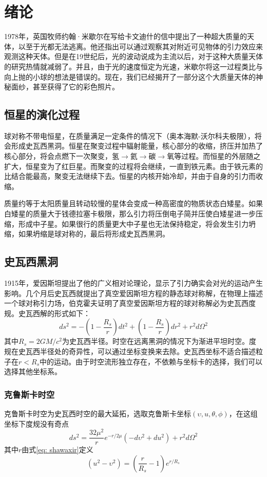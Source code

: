 \chapter{绪论}

1978年，英国牧师约翰·米歇尔在写给卡文迪什的信中提出了一种超大质量的天体，以至于光都无法逃离\citep{michell1784vii}。他还指出可以通过观察其对附近可见物体的引力效应来观测这种天体。但是在19世纪后，光的波动说成为主流以后，对于这种大质量天体的研究热情就减弱了。并且，由于光的速度恒定为光速，米歇尔将这一过程类比与向上抛的小球的想法是错误的。现在，我们已经揭开了一部分这个大质量天体的神秘面纱，甚至获得了它的彩色照片\citep{akiyama2021first}。

\section{恒星的演化过程}
球对称不带电恒星，在质量满足一定条件的情况下（奥本海默-沃尔科夫极限），将会形成史瓦西黑洞。恒星在聚变过程中辐射能量，核心部分的收缩，挤压并加热了核心部分，将会点燃下一次聚变，氢$\rightarrow$氦$\rightarrow$碳$\rightarrow$氧等过程。而恒星的外层随之扩大，恒星变为了红巨星。而聚变的过程将会继续，一直到铁元素。由于铁元素的比结合能最高，聚变无法继续下去。恒星的内核开始冷却，并由于自身的引力而收缩。

质量约等于太阳质量且转动较慢的星体会变成一种高密度的物质状态白矮星。如果白矮星的质量大于钱德拉塞卡极限，那么引力将压倒电子简并压使白矮星进一步压缩，形成中子星。如果很行的质量更大中子星也无法保持稳定，将会发生引力坍缩，如果坍缩是球对称的，最后将形成史瓦西黑洞。

\section{史瓦西黑洞}
1915年，爱因斯坦提出了他的广义相对论理论，显示了引力确实会对光的运动产生影响。几个月后史瓦西就提出了真空爱因斯坦方程的静态球对称解\citep{schwarzschild1916gravitationsfeld}，在物理上描述一个球对称引力场，伯克霍夫证明了真空爱因斯坦方程的球对称解必为史瓦西度规\citep{birkhoff1923relativity}。史瓦西解的形式如下：
\begin{equation}
    ds^2=-\left(1-\frac{R_s}{r}\right)dt^2+\left(1-\frac{R_s}{r}\right)dr^2+r^2d\Omega^2
\end{equation}
其中$R_s=2GM/c^2$为史瓦西半径。时空在远离黑洞的情况下为渐进平坦时空。度规在史瓦西半径处的奇异性，可以通过坐标变换来去除。史瓦西坐标不适合描述粒子在$r<R_s$中的运动。由于时空流形独立存在，不依赖与坐标卡的选择，我们可以选择其他坐标系。

\subsection{克鲁斯卡时空}
克鲁斯卡时空为史瓦西时空的最大延拓，选取克鲁斯卡坐标$\left(\upsilon, u, \theta, \phi\right)$，在这组坐标下度规没有奇点
\begin{equation}
    ds^2=\frac{32\mu^2}{r} e^{-r/2\mu}\left(-d\upsilon^2+du^2 \right)+r^2d\Omega^2
\end{equation}
其中$r$由式\eqref{eq: shawaxir}定义
\begin{equation}\label{eq: shawaxir}
    \left(u^2-\upsilon^2\right)=\left(\frac{r}{R_s}-1\right)e^{r/R_s}
\end{equation}

